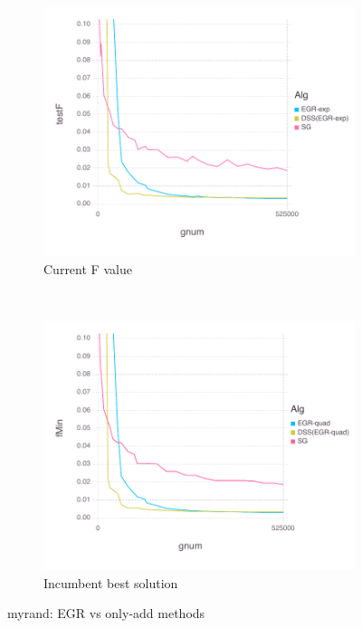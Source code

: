 \documentclass[11pt]{article}
\begin{document}
   \begin{figure}[H]
       \centering
       \begin{subfigure}[b]{0.45\textwidth}
           \includegraphics[width=\textwidth]{Figures/myrandBLtrueFfFinal-dss.pdf}
           \caption{Current F value}
       \end{subfigure}
       ~ %
         \begin{subfigure}[b]{0.45\textwidth}
             \includegraphics[width=\textwidth]{Figures/myrandBLtrueFminfFinal-dss.pdf}
             \caption{Incumbent best solution}
         \end{subfigure}
       \caption{myrand: EGR vs only-add methods}\label{fig:myrandoa}
   \end{figure}
   
\end{document}
